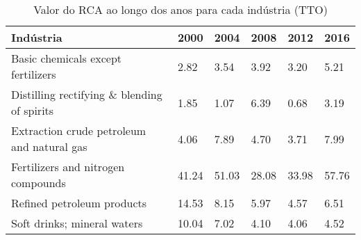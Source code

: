 \begin{table}
\centering
\caption{Valor do RCA ao longo dos anos para cada indústria (TTO)}
\begin{tabular}{p{6cm}p{1.5cm}p{1.5cm}p{1.5cm}p{1.5cm}p{1.5cm}}
\toprule
                                  Indústria &  2000 &  2004 &  2008 &  2012 &  2016 \\
\midrule
         Basic chemicals except fertilizers &  2.82 &  3.54 &  3.92 &  3.20 &  5.21 \\
Distilling rectifying \& blending of spirits &  1.85 &  1.07 &  6.39 &  0.68 &  3.19 \\
 Extraction crude petroleum and natural gas &  4.06 &  7.89 &  4.70 &  3.71 &  7.99 \\
         Fertilizers and nitrogen compounds & 41.24 & 51.03 & 28.08 & 33.98 & 57.76 \\
                 Refined petroleum products & 14.53 &  8.15 &  5.97 &  4.57 &  6.51 \\
                Soft drinks; mineral waters & 10.04 &  7.02 &  4.10 &  4.06 &  4.52 \\
\bottomrule
\end{tabular}
\end{table}
